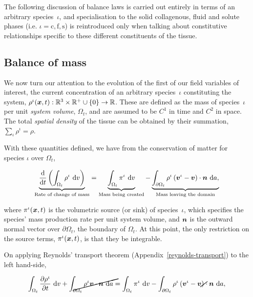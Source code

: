 The following discussion of balance laws is carried out entirely in
terms of an arbitrary species~$\iota$, and specialisation to the solid
collagenous, fluid and solute phases (i.e. \mbox{$\iota=\mathrm{c},
  \mathrm{f}, \mathrm{s}$}) is reintroduced only when talking about
constitutive relationships specific to these different constituents of
the tissue.

\subsection{Balance of mass}
\label{eu-balance-of-mass}

We now turn our attention to the evolution of the first of our field
variables of interest, the current concentration of an arbitrary
species~$\iota$ constituting the system, $\rho^{\iota}(\mbox{\boldmath$ x$},t):
\mathbb{R}^3\times\mathbb{R}^{+}\cup\{0\} \rightarrow
\mathbb{R}$. These are defined as the mass of species~$\iota$ per unit
       {\em system volume}, $\Omega_{t}$, and are assumed to be
       $\mathit{C}^{1}$ in time and $\mathit{C}^{2}$ in space. The
       total {\em spatial density} of the tissue can be obtained by
       their summation, $\sum\limits_{\iota}\rho^\iota = \rho$.

With these quantities defined, we have from the conservation of matter
for species $\iota$ over $\Omega_{t}$,

\begin{equation}
\underbrace{\frac{\mathrm{d}} {\mathrm{d}t}\left(\int_{\Omega_{t}}
  \rho^{\iota} \ \mathrm{d}v \right)}_{\text{Rate of change of mass}}
= \underbrace{\int_{\Omega_{t}} \pi^{\iota} \ \mathrm{d}v}_{\text{Mass
    being created}} - \underbrace{\int_{\partial \Omega_{t}}
  \rho^{\iota} \left(\mbox{\boldmath$ v$}^{\iota} - \mbox{\boldmath$ v$}\right) \cdot
  \mbox{\boldmath$ n$}\ \mathrm{d}a,}_{\text{Mass leaving the domain}}
\label{eu-globalbalanceofmass}
\end{equation}

\noindent where $\pi^{\iota}(\mbox{\boldmath$ x$},t)$ is the volumetric source (or
sink) of species~$\iota$, which specifies the species' mass production
rate per unit system volume, and $\mbox{\boldmath$ n$}$ is the outward normal vector
over $\partial \Omega_{t}$, the boundary of $\Omega_{t}$. At this
point, the only restriction on the source terms, $\pi^{\iota}(\mbox{\boldmath$ x$},t)$,
is that they be integrable.

On applying Reynolds' transport theorem
(Appendix~\ref{reynolds-transport}) to the left hand-side,

\begin{equation*}
\int_{\Omega_{t}} \frac{\partial \rho^{\iota}}{\partial t}
\ \mathrm{d}v + \cancel{\int_{\partial \Omega_{t}} \rho^{\iota} \bv
  \cdot \bn\ \mathrm{d}a} = \int_{\Omega_{t}} \pi^{\iota}
\ \mathrm{d}v - \int_{\partial \Omega_{t}} \rho^{\iota}
\left(\bv^{\iota} - \cancel{\bv}\right) \cdot \bn\ \mathrm{d}a,
\end{equation*}

